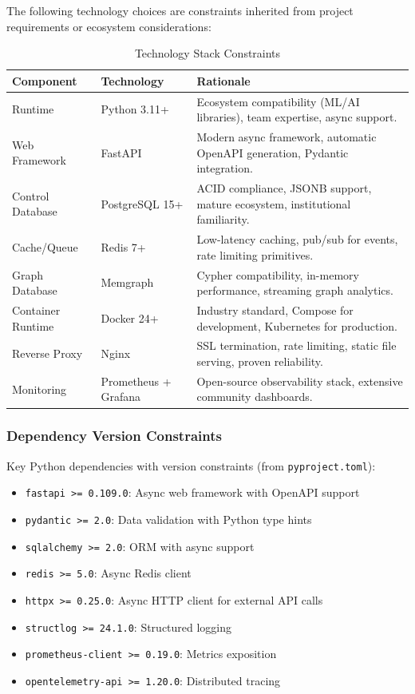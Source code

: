 \documentclass[a4paper,twoside]{sapthesis}
\begin{document}
The following technology choices are constraints inherited from project requirements or ecosystem considerations:

\begin{table}[htbp]
\centering
\caption{Technology Stack Constraints}
\label{tab:technology-constraints}
\small
\begin{tabularx}{\textwidth}{|l|l|X|}
\hline
\textbf{Component} & \textbf{Technology} & \textbf{Rationale} \\
\midrule
Runtime & Python 3.11+ & Ecosystem compatibility (ML/AI libraries), team expertise, async support. \\
\midrule
Web Framework & FastAPI & Modern async framework, automatic OpenAPI generation, Pydantic integration. \\
\midrule
Control Database & PostgreSQL 15+ & ACID compliance, JSONB support, mature ecosystem, institutional familiarity. \\
\midrule
Cache/Queue & Redis 7+ & Low-latency caching, pub/sub for events, rate limiting primitives. \\
\midrule
Graph Database & Memgraph & Cypher compatibility, in-memory performance, streaming graph analytics. \\
\midrule
Container Runtime & Docker 24+ & Industry standard, Compose for development, Kubernetes for production. \\
\midrule
Reverse Proxy & Nginx & SSL termination, rate limiting, static file serving, proven reliability. \\
\midrule
Monitoring & Prometheus + Grafana & Open-source observability stack, extensive community dashboards. \\
\midrule
\end{tabularx}
\end{table}

\subsubsection{Dependency Version Constraints}

Key Python dependencies with version constraints (from \texttt{pyproject.toml}):

\begin{itemize}
    \item \texttt{fastapi >= 0.109.0}: Async web framework with OpenAPI support
    \item \texttt{pydantic >= 2.0}: Data validation with Python type hints
    \item \texttt{sqlalchemy >= 2.0}: ORM with async support
    \item \texttt{redis >= 5.0}: Async Redis client
    \item \texttt{httpx >= 0.25.0}: Async HTTP client for external API calls
    \item \texttt{structlog >= 24.1.0}: Structured logging
    \item \texttt{prometheus-client >= 0.19.0}: Metrics exposition
    \item \texttt{opentelemetry-api >= 1.20.0}: Distributed tracing
\end{itemize}
\end{document}

